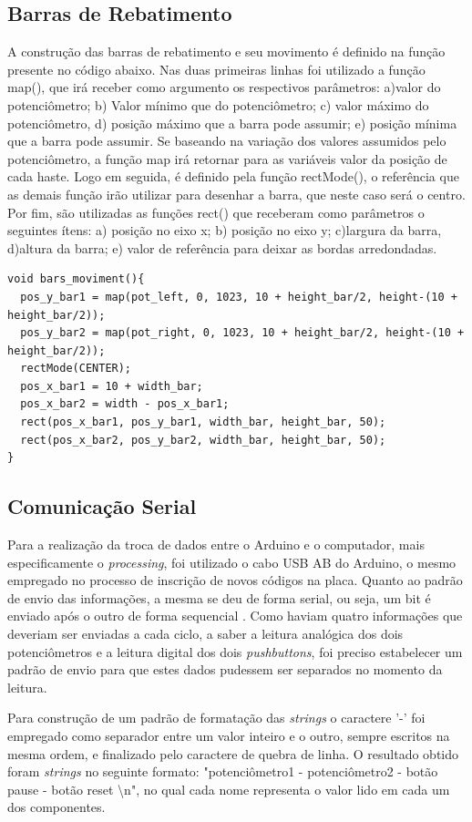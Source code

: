 \documentclass[conference]{IEEEtran}
\begin{document}
\subsection{Barras de Rebatimento}
A construção das barras de rebatimento e seu movimento é definido na função presente no código abaixo. Nas  duas primeiras linhas foi utilizado a função map(), que irá receber como argumento os respectivos parâmetros: a)valor do potenciômetro; b) Valor mínimo que do potenciômetro; c) valor máximo do potenciômetro, d) posição máximo que a barra pode assumir; e) posição mínima que a barra pode assumir. Se baseando na variação dos valores assumidos pelo potenciômetro, a função map irá retornar para as variáveis valor da posição de cada haste. Logo em seguida, é definido pela função rectMode(), o referência que as demais função irão utilizar para desenhar a barra, que neste caso será o centro. Por fim, são utilizadas as funções rect() que receberam como parâmetros o seguintes ítens: a) posição no eixo x; b) posição no eixo y; c)largura da barra, d)altura da barra; e) valor de referência para deixar as bordas arredondadas.
    \begin{lstlisting}
void bars_moviment(){
  pos_y_bar1 = map(pot_left, 0, 1023, 10 + height_bar/2, height-(10 + height_bar/2));
  pos_y_bar2 = map(pot_right, 0, 1023, 10 + height_bar/2, height-(10 + height_bar/2));
  rectMode(CENTER);
  pos_x_bar1 = 10 + width_bar;
  pos_x_bar2 = width - pos_x_bar1;
  rect(pos_x_bar1, pos_y_bar1, width_bar, height_bar, 50);
  rect(pos_x_bar2, pos_y_bar2, width_bar, height_bar, 50);
}
    \end{lstlisting}


\subsection{Comunicação Serial}
Para a realização da troca de dados entre o Arduino e o computador, mais especificamente o \emph{processing}, foi utilizado o cabo USB AB do Arduino, o mesmo empregado no processo de inscrição de novos códigos na placa. Quanto ao padrão de envio das informações, a mesma se deu de forma serial, ou seja, um bit é enviado após o outro de forma sequencial \cite{ArduinoHomepage}. Como haviam quatro informações que deveriam ser enviadas a cada ciclo, a saber a leitura analógica dos dois potenciômetros e a leitura digital dos dois \emph{pushbuttons}, foi preciso estabelecer um padrão de envio para que estes dados pudessem ser separados no momento da leitura. 

Para construção de um padrão de formatação das \emph{strings} o caractere '-' foi empregado como separador entre um valor inteiro e o outro, sempre escritos na mesma ordem, e finalizado pelo caractere de quebra de linha. O resultado obtido foram \emph{strings} no seguinte formato: "potenciômetro1 - potenciômetro2 - botão pause - botão reset \textbackslash n", no qual cada nome representa o valor lido em cada um dos componentes.
\end{document}
